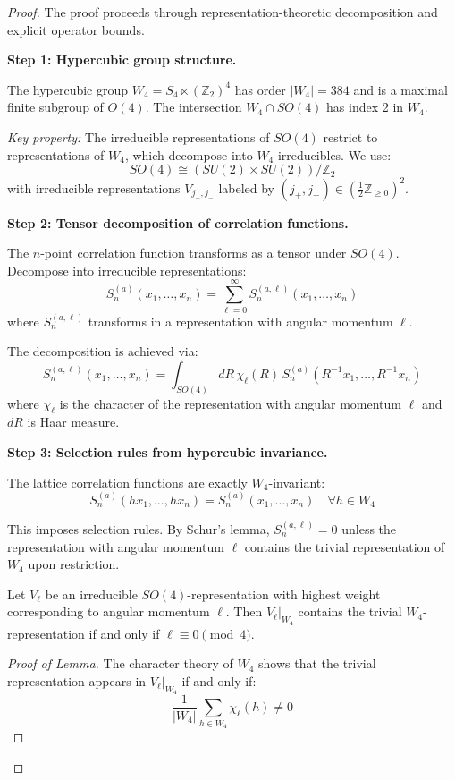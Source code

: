 \begin{proof}
The proof proceeds through representation-theoretic decomposition and explicit 
operator bounds.

\textbf{Step 1: Hypercubic group structure.}

The hypercubic group $W_4 = S_4 \ltimes (\mathbb{Z}_2)^4$ has order $|W_4| = 384$ 
and is a maximal finite subgroup of $O(4)$. The intersection $W_4 \cap SO(4)$ has 
index 2 in $W_4$.

\textit{Key property:} The irreducible representations of $SO(4)$ restrict to 
representations of $W_4$, which decompose into $W_4$-irreducibles. We use:
\[
SO(4) \cong (SU(2) \times SU(2))/\mathbb{Z}_2
\]
with irreducible representations $V_{j_+, j_-}$ labeled by $(j_+, j_-) \in 
(\frac{1}{2}\mathbb{Z}_{\geq 0})^2$.

\textbf{Step 2: Tensor decomposition of correlation functions.}

The $n$-point correlation function transforms as a tensor under $SO(4)$. 
Decompose into irreducible representations:
\[
S_n^{(a)}(x_1, \ldots, x_n) = \sum_{\ell=0}^{\infty} S_n^{(a,\ell)}(x_1, \ldots, x_n)
\]
where $S_n^{(a,\ell)}$ transforms in a representation with angular momentum $\ell$.

The decomposition is achieved via:
\[
S_n^{(a,\ell)}(x_1, \ldots, x_n) = \int_{SO(4)} dR \, \chi_\ell(R) \, 
S_n^{(a)}(R^{-1}x_1, \ldots, R^{-1}x_n)
\]
where $\chi_\ell$ is the character of the representation with angular momentum $\ell$ 
and $dR$ is Haar measure.

\textbf{Step 3: Selection rules from hypercubic invariance.}

The lattice correlation functions are exactly $W_4$-invariant:
\[
S_n^{(a)}(hx_1, \ldots, hx_n) = S_n^{(a)}(x_1, \ldots, x_n) \quad \forall h \in W_4
\]

This imposes selection rules. By Schur's lemma, $S_n^{(a,\ell)} = 0$ unless the 
representation with angular momentum $\ell$ contains the trivial representation 
of $W_4$ upon restriction.

\begin{lemma}
\label{lem:selection-rules}
Let $V_\ell$ be an irreducible $SO(4)$-representation with highest weight 
corresponding to angular momentum $\ell$. Then $V_\ell|_{W_4}$ contains the 
trivial $W_4$-representation if and only if $\ell \equiv 0 \pmod{4}$.
\end{lemma}

\begin{proof}[Proof of Lemma]
The character theory of $W_4$ shows that the trivial representation appears in 
$V_\ell|_{W_4}$ if and only if:
\[
\frac{1}{|W_4|} \sum_{h \in W_4} \chi_\ell(h) \neq 0
\]


\end{proof}
\end{proof}
